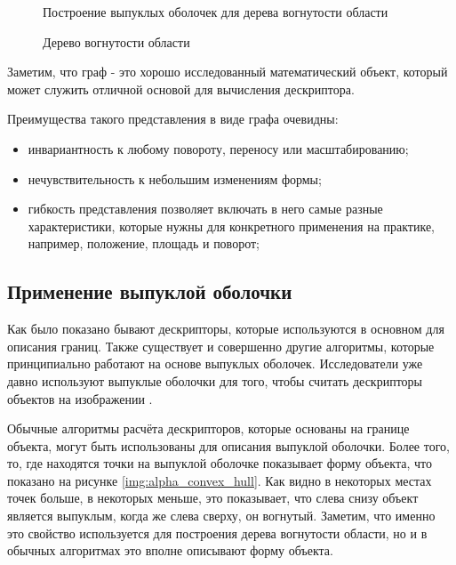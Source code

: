 \begin{figure}
	{\centering
		\hfill
		\subbottom[\label{img:concavity_tree_1_1}]{%
			}
		\hfill
		\subbottom[\label{img:concavity_tree_1_2}]{%
			}
		\hfill
	}
	\caption{Построение выпуклых оболочек для дерева вогнутости области}
	\label{img:concavity_tree_1}
\end{figure}

\begin{figure}
	{\centering
		\hfill
		\subbottom[\label{img:concavity_tree_2_1}]{%
			}
		\hfill
		\subbottom[\label{img:concavity_tree_2_2}]{%
			}
		\hfill
	}
	\caption{Дерево вогнутости области}
	\label{img:concavity_tree_2}
\end{figure}

Заметим, что граф - это хорошо исследованный математический объект, который может служить отличной основой для вычисления дескриптора.

Преимущества такого представления в виде графа очевидны:
\begin{itemize}
	\item инвариантность к любому повороту, переносу или масштабированию;
	\item нечувствительность к небольшим изменениям формы;
	\item гибкость представления позволяет включать в него самые разные характеристики, которые нужны для конкретного применения на практике, например, положение, площадь и поворот;
\end{itemize}

\subsection{Применение выпуклой оболочки}

Как было показано бывают дескрипторы, которые используются в основном для описания границ. Также существует и совершенно другие алгоритмы, которые принципиально работают на основе выпуклых оболочек. Исследователи уже давно используют выпуклые оболочки для того, чтобы считать дескрипторы объектов на изображении \cite{dalitz2013fourier, mathew2015content, sonka2014image}.

Обычные алгоритмы расчёта дескрипторов, которые основаны на границе объекта, могут быть использованы для описания выпуклой оболочки. Более того, то, где находятся точки на выпуклой оболочке показывает форму объекта, что показано на рисунке \ref{img:alpha_convex_hull}. Как видно в некоторых местах точек больше, в некоторых меньше, это показывает, что слева снизу объект является выпуклым, когда же слева сверху, он вогнутый. Заметим, что именно это свойство используется для построения дерева вогнутости области, но и в обычных алгоритмах это вполне описывают форму объекта.

